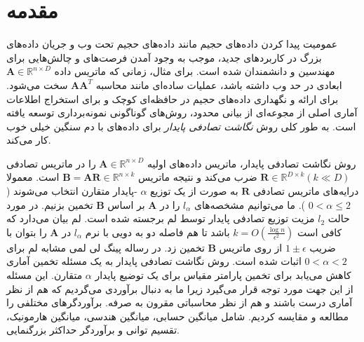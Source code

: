 \chapter{مقدمه}

عمومیت پیدا کردن داده‌های حجیم مانند داده‌های حجیم تحت وب و جریان‌ داده‌های بزرگ در کاربردهای جدید،
موجب به وجود آمدن فرصت‌های و چالش‌هایی برای مهندسین و دانشمندان شده است.%
\cite{li2007stable}
برای مثال، زمانی که ماتریس داده 
$\mathbf{A} \in \mathbb{R}^{n \times D}$
ابعادی در حد وب داشته باشد، عملیات ساده‌ای مانند محاسبه
$\mathbf{A} \mathbf{A}^T$
سخت می‌شود.
برای ارائه و نگهداری داده‌های حجیم در حافظه‌ای کوچک و برای استخراج اطلاعات آماری اصلی از مجوعه‌ای از بیانی محدود، روش‌های گوناگونی نمونه‌برداری توسعه‌ یافته است. به طور کلی روش 
\textit{نگاشت تصادفی پایدار}%
 برای داده‌های با دم سنگین خیلی خوب کار می‌کند.

روش نگاشت تصادفی پایدار، ماتریس داده‌های اولیه 
$\mathbf{A} \in \mathbb{R}^{n \times D}$
را در ماتریس تصادفی 
$\mathbf{R} \in \mathbb{R}^{D \times k} (k \ll D)$
 ضرب می‌کند و نتیجه ماتریس
$\mathbf{B} = \mathbf{AR} \in \mathbb{R}^{n \times k}$
است. 
معمولا درایه‌های ماتریس تصادفی
$\mathbf{R}$
به صورت 
%
از یک توزیع 
$\alpha$
-پایدار متقارن انتخاب می‌شوند (
$ 0 < \alpha \leq 2$
).
ما می‌توانیم مشخصه‌های 
$l_\alpha$
را در 
$\mathbf{A}$
بر اساس 
$\mathbf{B}$
تخمین بزنیم. در مورد حالت 
$l_2$
مزیت توزیع تصادفی پایدار توسط لم 
%
برجسته شده است. لم 
بیان می‌دارد که کافی است 
$k=O(\frac{ \log  n}{\epsilon^ 2})$
باشد تا هم فاصله دو به دویی با نرم 
$l_\alpha$
در 
$\mathbf{A}$
را بتوان با ضریب 
$1 \pm \epsilon$
از روی ماتریس 
$\mathbf{B}$
تخمین زد. در رساله پینگ لی%
\cite{li2007stable}
لمی مشابه لم 
برای 
$0 < \alpha < 2$
اثبات شده است. روش نگاشت تصادفی پایدار به یک مسئله تخمین آماری کاهش می‌یابد برای تخمین پارامتر مقیاس برای یک توضیع پایدار $\alpha$ متقارن. این مسئله از این جهت مورد توجه قرار می‌گیرد زیرا ما به دنبال برآوردی می‌گردیم که هم از نظر آماری درست باشند و هم از نظر محاسباتی مقرون به صرفه. برآوردگرهای مختلفی را مطالعه و مقایسه کردیم. شامل میانگین حسابی، میانگین هندسی، میانگین هارمونیک، تقسیم توانی%
و برآوردگر حداکثر بزرگنمایی.

